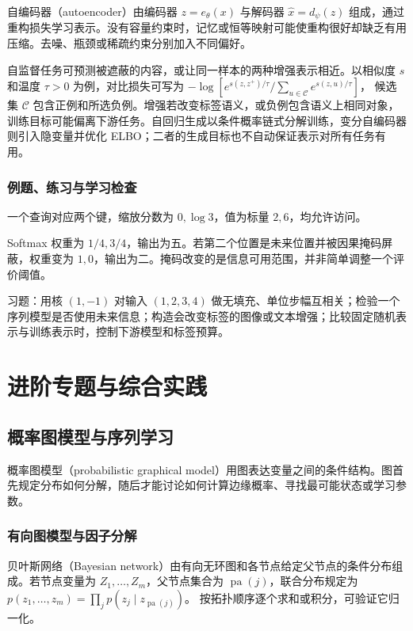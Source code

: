 \documentclass[UTF8,12pt,a4paper,fontset=fandol]{ctexbook}
\begin{document}
自编码器（autoencoder）由编码器 $z=e_\theta(x)$ 与解码器 $\widehat x=d_\psi(z)$ 组成，通过重构损失学习表示。没有容量约束时，记忆或恒等映射可能使重构很好却缺乏有用压缩。去噪、瓶颈或稀疏约束分别加入不同偏好。

自监督任务可预测被遮蔽的内容，或让同一样本的两种增强表示相近。以相似度 $s$ 和温度 $\tau>0$ 为例，对比损失可写为
$-\log[e^{s(z,z^+)/\tau}/\sum_{u\in\mathcal C}e^{s(z,u)/\tau}]$，
候选集 $\mathcal C$ 包含正例和所选负例。增强若改变标签语义，或负例包含语义上相同对象，训练目标可能偏离下游任务。自回归生成以条件概率链式分解训练，变分自编码器则引入隐变量并优化 ELBO；二者的生成目标也不自动保证表示对所有任务有用。

\section{例题、练习与学习检查}

\begin{example}[注意力的加权平均]
一个查询对应两个键，缩放分数为 $0,\log3$，值为标量 $2,6$，均允许访问。
\end{example}
\begin{solve}
Softmax 权重为 $1/4,3/4$，输出为五。若第二个位置是未来位置并被因果掩码屏蔽，权重变为 $1,0$，输出为二。掩码改变的是信息可用范围，并非简单调整一个评价阈值。
\end{solve}

习题：用核 $(1,-1)$ 对输入 $(1,2,3,4)$ 做无填充、单位步幅互相关；检验一个序列模型是否使用未来信息；构造会改变标签的图像或文本增强；比较固定随机表示与训练表示时，控制下游模型和标签预算。

\part{进阶专题与综合实践}

\chapter{概率图模型与序列学习}
\label{chap:ml-graphical}

概率图模型（probabilistic graphical model）用图表达变量之间的条件结构。图首先规定分布如何分解，随后才能讨论如何计算边缘概率、寻找最可能状态或学习参数。

\section{有向图模型与因子分解}

贝叶斯网络（Bayesian network）由有向无环图和各节点给定父节点的条件分布组成。若节点变量为 $Z_1,\ldots,Z_m$，父节点集合为 $\operatorname{pa}(j)$，联合分布规定为
$p(z_1,\ldots,z_m)=\prod_jp(z_j\mid z_{\operatorname{pa}(j)})$。
按拓扑顺序逐个求和或积分，可验证它归一化。
\end{document}
